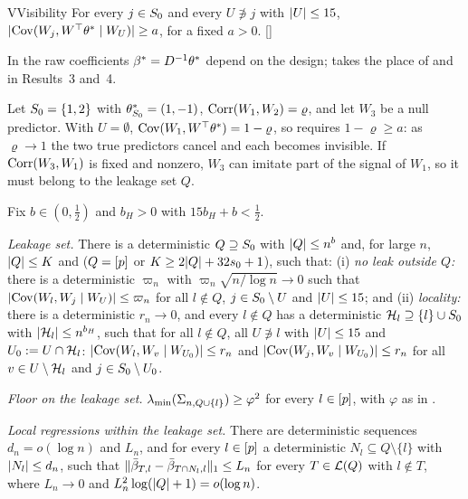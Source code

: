 \begin{assumption}{V}{Visibility}
For every $j\in S_0$ and every $U\not\ni j$ with $\lvert U\rvert\le15$, $\lvert \operatorname{Cov}(W_j,W^\top\theta^*\mid W_U)\rvert\ge a$, for a fixed
$a>0$. \hfill []
\end{assumption}

In  the raw coefficients $\beta^*=D^{-1}\theta^*$ depend on the design;  takes the place of  and 
in Results~3 and~4.

\begin{example}\label{ex:visibility}
Let $S_0=\{1,2\}$ with $\theta^*_{S_0}=(1,-1)$, $\operatorname{Corr}(W_1,W_2)=\varrho$, and let $W_3$ be a null predictor. With $U=\emptyset$,
$\operatorname{Cov}(W_1,W^\top\theta^*)=1-\varrho$, so  requires $1-\varrho\ge a$: as $\varrho\to1$ the two true predictors cancel and
each becomes invisible. If $\operatorname{Corr}(W_3,W_1)$ is fixed and nonzero, $W_3$ can imitate part of the signal of $W_1$, so it
must belong to the leakage set $Q$.
\end{example}

Fix $b\in(0,\tfrac12)$ and $b_H>0$ with $15b_H+b<\tfrac12$.

\begin{localassumption}\label{asm:reported}
\begin{asmitems}
  \item\label{asm:rr-leak} \emph{Leakage set.} There is a deterministic $Q\supseteq S_0$ with $\lvert Q\rvert\le n^b$ and, for
    large $n$, $\lvert Q\rvert\le K$ and ($Q=[p]$ or $K\ge2\lvert Q\rvert+32s_0+1$), such that: (i) \emph{no leak outside $Q$:}
    there is a deterministic $\varpi_n$ with $\varpi_n\sqrt{n/\log n}\to0$ such that
    $\lvert \operatorname{Cov}(W_l,W_j\mid W_U)\rvert\le\varpi_n$ for all $l\notin Q$, $j\in S_0\setminus U$ and $\lvert U\rvert\le15$; and (ii)
    \emph{locality:} there is a deterministic $r_n\to0$, and every $l\notin Q$ has a deterministic
    $\mathcal H_l\supseteq\{l\}\cup S_0$ with $\lvert \mathcal H_l\rvert\le n^{b_H}$, such that for all $l\notin Q$, all $U\not\ni l$ with
    $\lvert U\rvert\le15$ and $U_0:=U\cap\mathcal H_l$: $\lvert \operatorname{Cov}(W_l,W_v\mid W_{U_0})\rvert\le r_n$ and
    $\lvert \operatorname{Cov}(W_j,W_v\mid W_{U_0})\rvert\le r_n$ for all $v\in U\setminus\mathcal H_l$ and $j\in S_0\setminus U_0$.
  \item\label{asm:rr-floor} \emph{Floor on the leakage set.} $\lambda_{\min}(\Sigma_{n,Q\cup\{l\}})\ge\varphi^2$ for every
    $l\in[p]$, with $\varphi$ as in .
  \item\label{asm:rr-local} \emph{Local regressions within the leakage set.} There are deterministic sequences
    $d_n=o(\log n)$ and $L_n$, and for every $l\in[p]$ a deterministic $N_l\subseteq Q\setminus\{l\}$ with
    $\lvert N_l\rvert\le d_n$, such that $\lVert \bar\beta_{T,l}-\bar\beta_{T\cap N_l,l}\rVert_1\le L_n$ for every $T\in\mathcal L(Q)$ with
    $l\notin T$, where $L_n\to0$ and $L_n^2\log(\lvert Q\rvert+1)=o(\log n)$.
\end{asmitems}
\end{localassumption}


